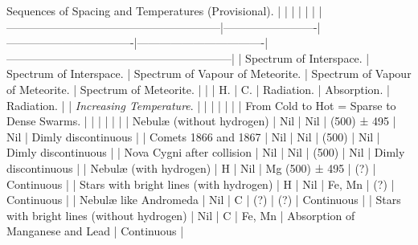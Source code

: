 \documentclass[a4paper, 12pt, oneside, polutonikogreek, english]{article}
\begin{document}
Sequences of Spacing and Temperatures (Provisional). 
|                             |             |                 |                 |                              |
|---------------------------------------------------------|-------------------------|----------------------------------|----------------------------------|------------------------------------------------------------|
| Spectrum of Interspace.                 | Spectrum of Interspace. | Spectrum of Vapour of Meteorite. | Spectrum of Vapour of Meteorite. | Spectrum of Meteorite.                   |
|                             | H.           | C.                | Radiation.            | Absorption.                        | Radiation.                                                                         |
| \emph{Increasing Temperature}.                |             |                 |                 |                              |                                                                               |
| From Cold to Hot = Sparse to Dense Swarms.       |             |                 |                 |                              |                                                                               |
| Nebulæ (without hydrogen)                | Nil           | Nil               | (500) ± 495           | Nil                            | Dimly discontinuous                                                                     |
| Comets 1866 and 1867                  | Nil           | Nil               | (500)              | Nil                            | Dimly discontinuous                                                                     |
| Nova Cygni after collision               | Nil           | Nil               | (500)              | Nil                            | Dimly discontinuous                                                                     |
| Nebulæ (with hydrogen)                 | H            | Nil               | Mg (500) ± 495          | (?)                            | Continuous                                                                         |
| Stars with bright lines (with hydrogen)         | H            | Nil               | Fe, Mn              | (?)                            | Continuous                                                                         |
| Nebulæ like Andromeda                  | Nil           | C                | (?)               | (?)                            | Continuous                                                                         |
| Stars with bright lines (without hydrogen)       | Nil           | C                | Fe, Mn              | Absorption of Manganese and Lead              | Continuous                                                                         |
\end{document}
